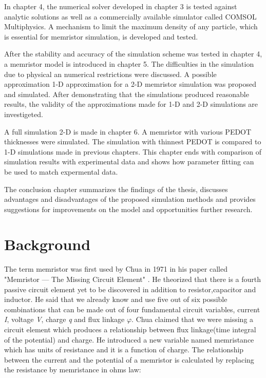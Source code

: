 In chapter 4, the numerical solver developed in chapter 3 is tested against analytic solutions as well as a commercially available simulator called COMSOL Multiphysics. A mechanism to limit the maximum density of any particle, which is essential for memristor simulation, is developed and tested. 

After the stability and accuracy of the simulation scheme was tested in chapter 4, a memristor model is introduced in chapter 5. The difficulties in the simulation due to physical an numerical restrictions were discussed. A possible approximation 1-D approximation for a 2-D memristor simulation was proposed and simulated. After demonstrating that the simulations produced reasonable results, the validity of the approximations made for 1-D and 2-D simulations are investigeted.  

A full simulation 2-D is made in chapter 6. A memristor with various PEDOT thicknesses were simulated. The simulation with thinnest PEDOT is compared to 1-D simulations made in previous chapters. This chapter ends with comparison of simulation results with experimental data and shows how parameter fitting can be used to match expermental data.

The conclusion chapter summarizes the findings of the thesis, discusses advantages and disadvantages of the proposed simulation methods and provides suggestions for improvements on the model and opportunities further research.




\section{Background}
The term memristor was first used by Chua in 1971 in his paper called  "Memristor — The Missing Circuit Element" \cite{chua}. He theorized that there is a fourth passive circuit element yet to be discovered in addition to resistor,capacitor and inductor. He said that we already know and use five out of six possible combinations that can be made out of four fundamental circuit variables, current \textit{I}, voltage \textit{V}, charge \textit{q} and flux linkage \textit{$\varphi$}. Chua claimed that we were missing a circuit element which produces a relationship between flux linkage(time integral of the potential) and charge. He introduced a new variable named memristance which has units of resistance and it is a function of charge. The relationship between the current and the potential of a memristor is calculated by replacing the resistance by memristance in ohms law:


